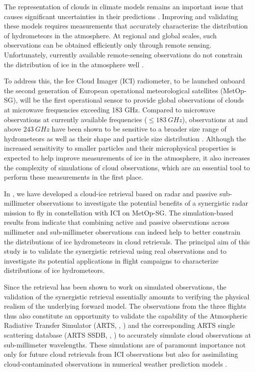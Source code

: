 \documentclass[journal abbreviation, manuscript]{copernicus}
\begin{document}
\introduction  %

The representation of clouds in climate models remains an important issue that
causes significant uncertainties in their predictions \citep{zelinka20}.
Improving and validating these models requires measurements that accurately
characterize the distribution of hydrometeors in the atmosphere. At regional and
global scales, such observations can be obtained efficiently only through remote
sensing. Unfortunately, currently available remote-sensing observations do not
constrain the distribution of ice in the atmosphere well \citep{waliser09,
  eliasson11, duncan18a}.

To address this, the Ice Cloud Imager (ICI) radiometer, to be launched onboard
the second generation of European operational meteorological satellites
(MetOp-SG), will be the first operational sensor to provide global observations
of clouds at microwave frequencies exceeding 183 GHz. Compared to microwave
observations at currently available frequencies ($\leq 183\ \unit{GHz}$),
observations at and above $243\ \unit{GHz}$ have been shown to be sensitive to a
broader size range of hydrometeors \citep{buehler12} as well as their shape and
particle size distribution \citep{evans98}. Although the increased sensitivity
to smaller particles and their microphysical properties is expected to help
improve measurements of ice in the atmosphere, it also increases the complexity
of simulations of cloud observations, which are an essential tool to perform
these measurements in the first place.

In \citet{pfreundschuh20}, we have developed a cloud-ice retrieval based on
radar and passive sub-millimeter observations to investigate the potential
benefits of a synergistic radar mission to fly in constellation with ICI on
MetOp-SG. The simulation-based results from \citet{pfreundschuh20} indicate that
combining active and passive observations across millimeter and sub-millimeter
observations can indeed help to better constrain the distributions of ice
hydrometeors in cloud retrievals. The principal aim of this study is to validate
the synergistic retrieval using real observations and to investigate its
potential applications in flight campaigns to characterize distributions of ice
hydrometeors.

Since the retrieval has been shown to work on simulated observations, the
validation of the synergistic retrieval essentially amounts to verifying the
physical realism of the underlying forward model. The observations from the
three flights thus also constitute an opportunity to validate the capability of
the Atmospheric Radiative Transfer Simulator (ARTS, \citeauthor{arts18},
\citeyear{arts18}) and the corresponding ARTS single scattering database (ARTS
SSDB, \citeauthor{eriksson18}, \citeyear{eriksson18}) to accurately simulate
cloud observations at sub-millimeter wavelengths. These simulations are of
paramount importance not only for future cloud retrievals from ICI observations
\citep{eriksson20} but also for assimilating cloud-contaminated observations in
numerical weather prediction models \citep{geer17}.
\end{document}

